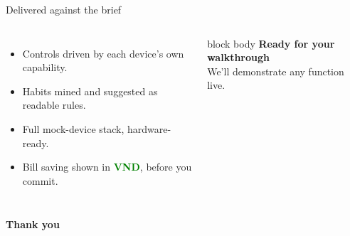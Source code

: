 \documentclass[aspectratio=169,11pt]{beamer}
\newcommand{\vnd}[1]{\textcolor{green}{\textbf{#1}}}
\begin{document}
\begin{frame}{Delivered against the brief}
  \vspace{0.4em}
  \begin{columns}[T]
    \begin{itemize}\setlength\itemsep{0.65em}
      \item[\textcolor{green}{$\checkmark$}] Controls driven by each device's own capability.
      \item[\textcolor{green}{$\checkmark$}] Habits mined and suggested as readable rules.
      \item[\textcolor{green}{$\checkmark$}] Full mock-device stack, hardware-ready.
      \item[\textcolor{green}{$\checkmark$}] Bill saving shown in \vnd{VND}, before you commit.
    \end{itemize}
    \vspace{0.3em}
    \begin{beamercolorbox}[wd=\textwidth,sep=12pt,rounded=true]{block body}
      \centering
      {\color{accent}\bfseries\large Ready for your walkthrough}\\[6pt]
      {\small\color{mut} We'll demonstrate any function live.}
    \end{beamercolorbox}
  \end{columns}
  \vfill
  \begin{center}{\large\bfseries\color{accent} Thank you}\end{center}
  \vspace{0.3em}
\end{frame}
\end{document}
